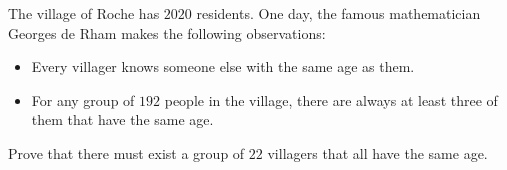 The village of Roche has $2020$ residents.
One day, the famous mathematician Georges de Rham makes the following observations:
\begin{itemize}
    \item Every villager knows someone else with the same age as them.
    \item For any group of $192$ people in the village,
    there are always at least three of them that have the same age.
\end{itemize}
Prove that there must exist a group of $22$ villagers that all have the same age.
